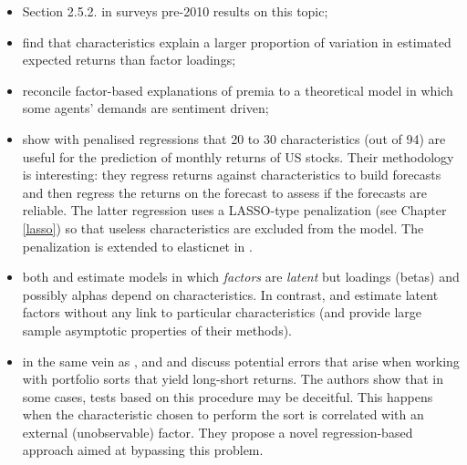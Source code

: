 \documentclass[]{krantz}
\providecommand{\tightlist}{%
  \setlength{\itemsep}{0pt}\setlength{\parskip}{0pt}}
\theoremstyle{definition}
\theoremstyle{definition}
\theoremstyle{definition}
\theoremstyle{remark}
\begin{document}
\begin{itemize}
\tightlist
\item
  Section 2.5.2. in \citet{goyal2012empirical} surveys pre-2010 results
  on this topic;\\
\item
  \citet{chordia2015cross} find that characteristics explain a larger
  proportion of variation in estimated expected returns than factor
  loadings;\\
\item
  \citet{kozak2018interpreting} reconcile factor-based explanations of
  premia to a theoretical model in which some agents' demands are
  sentiment driven;\\
\item
  \citet{han2018firm} show with penalised regressions that 20 to 30
  characteristics (out of 94) are useful for the prediction of monthly
  returns of US stocks. Their methodology is interesting: they regress
  returns against characteristics to build forecasts and then regress
  the returns on the forecast to assess if the forecasts are reliable.
  The latter regression uses a LASSO-type penalization (see Chapter
  \ref{lasso}) so that useless characteristics are excluded from the
  model. The penalization is extended to elasticnet in
  \citet{rapach2019time}.\\
\item
  both \citet{kelly2019characteristics} and \citet{kim2019arbitrage}
  estimate models in which \emph{factors} are \emph{latent} but loadings
  (betas) and possibly alphas depend on characteristics. In contrast,
  \citet{lettau2018estimating} and \citet{lettau2018factors} estimate
  latent factors without any link to particular characteristics (and
  provide large sample asymptotic properties of their methods).\\
\item
  in the same vein as \citet{hoechle2018correcting},
  \citet{gospodinov2019too} and \citet{bryzgalova2019spurious} and
  discuss potential errors that arise when working with portfolio sorts
  that yield long-short returns. The authors show that in some cases,
  tests based on this procedure may be deceitful. This happens when the
  characteristic chosen to perform the sort is correlated with an
  external (unobservable) factor. They propose a novel regression-based
  approach aimed at bypassing this problem.
\end{itemize}
\end{document}
